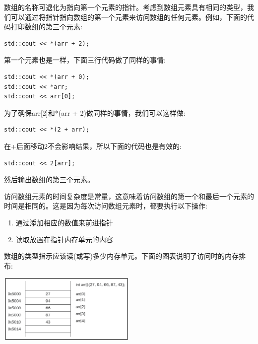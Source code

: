 数组的名称可退化为指向第一个元素的指针。考虑到数组元素具有相同的类型，我们可以通过将指针指向数组的第一个元素来访问数组的任何元素。例如，下面的代码打印数组的第三个元素: \par

\begin{lstlisting}[caption={}]
std::cout << *(arr + 2);
\end{lstlisting}

第一个元素也是一样，下面三行代码做了同样的事情: \par

\begin{lstlisting}[caption={}]
std::cout << *(arr + 0);
std::cout << *arr;
std::cout << arr[0];
\end{lstlisting}

为了确保arr[2]和*(arr + 2)做同样的事情，我们可以这样做:\par

\begin{lstlisting}[caption={}]
std::cout << *(2 + arr);
\end{lstlisting}

在+后面移动2不会影响结果，所以下面的代码也是有效的:\par

\begin{lstlisting}[caption={}]
std::cout << 2[arr];
\end{lstlisting}

然后输出数组的第三个元素。 \par

访问数组元素的时间复杂度是常量，这意味着访问数组的第一个和最后一个元素的时间是相同的。这是因为每次访问数组元素时，都要执行以下操作: \par

\begin{enumerate}
	\item 通过添加相应的数值来前进指针
	\item 读取放置在指针内存单元的内容 
\end{enumerate}

数组的类型指示应该读(或写)多少内存单元。下面的图表说明了访问时的内存排布: \par

\begin{center}
	\includegraphics[width=0.5\textwidth]{content/Section-1/Chapter-2/14}
\end{center}

